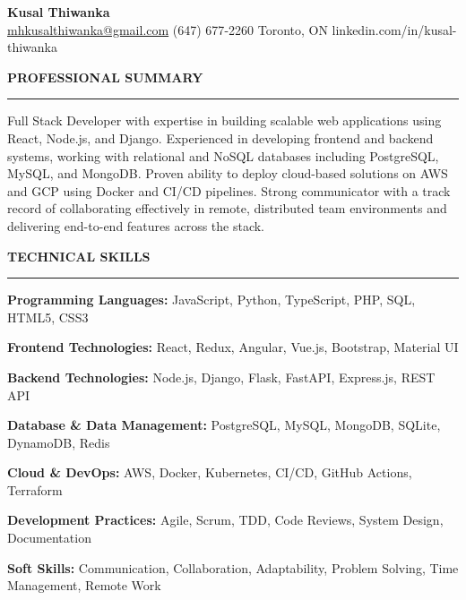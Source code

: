 \documentclass[10pt,letterpaper]{article}
\begin{document}
\begin{center}
{\LARGE\textbf{Kusal Thiwanka}}\\[3pt]
\href{mailto:mhkusalthiwanka@gmail.com}{mhkusalthiwanka@gmail.com}\hspace{2em}%
(647) 677{-}2260\hspace{2em}%
Toronto, ON\hspace{2em}
linkedin.com/in/kusal-thiwanka
\end{center}

\vspace{6pt}

\textbf{PROFESSIONAL SUMMARY}\\[-8pt]
\noindent\rule{\textwidth}{1pt}

\vspace{-2pt}

Full Stack Developer with expertise in building scalable web applications using React, Node.js, and Django. Experienced in developing frontend and backend systems, working with relational and NoSQL databases including PostgreSQL, MySQL, and MongoDB. Proven ability to deploy cloud-based solutions on AWS and GCP using Docker and CI/CD pipelines. Strong communicator with a track record of collaborating effectively in remote, distributed team environments and delivering end-to-end features across the stack.

\vspace{8pt}

\textbf{TECHNICAL SKILLS}\\[-8pt]
\noindent\rule{\textwidth}{1pt}

\vspace{-2pt}

\textbf{Programming Languages:} JavaScript, Python, TypeScript, PHP, SQL, HTML5, CSS3

\textbf{Frontend Technologies:} React, Redux, Angular, Vue.js, Bootstrap, Material UI

\textbf{Backend Technologies:} Node.js, Django, Flask, FastAPI, Express.js, REST API

\textbf{Database \& Data Management:} PostgreSQL, MySQL, MongoDB, SQLite, DynamoDB, Redis

\textbf{Cloud \& DevOps:} AWS, Docker, Kubernetes, CI/CD, GitHub Actions, Terraform

\textbf{Development Practices:} Agile, Scrum, TDD, Code Reviews, System Design, Documentation

\textbf{Soft Skills:} Communication, Collaboration, Adaptability, Problem Solving, Time Management, Remote Work
\end{document}
